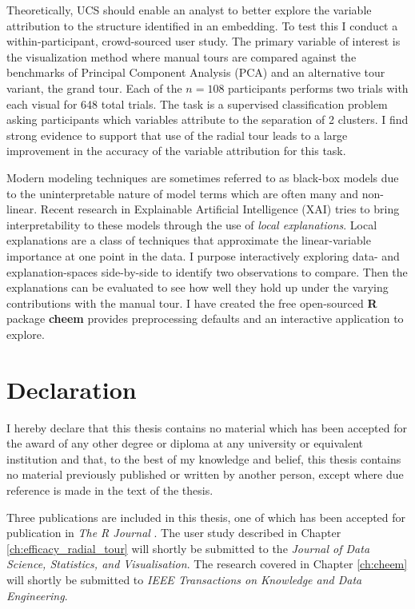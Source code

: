 \documentclass{template/monashthesis}
\begin{document}
Theoretically, UCS should enable an analyst to better explore the variable attribution to the structure identified in an embedding. To test this I conduct a within-participant, crowd-sourced user study. The primary variable of interest is the visualization method where manual tours are compared against the benchmarks of Principal Component Analysis (PCA) and an alternative tour variant, the grand tour. Each of the \(n=108\) participants performs two trials with each visual for 648 total trials. The task is a supervised classification problem asking participants which variables attribute to the separation of 2 clusters. I find strong evidence to support that use of the radial tour leads to a large improvement in the accuracy of the variable attribution for this task.

Modern modeling techniques are sometimes referred to as black-box models due to the uninterpretable nature of model terms which are often many and non-linear. Recent research in Explainable Artificial Intelligence (XAI) tries to bring interpretability to these models through the use of \emph{local explanations}. Local explanations are a class of techniques that approximate the linear-variable importance at one point in the data. I purpose interactively exploring data- and explanation-spaces side-by-side to identify two observations to compare. Then the explanations can be evaluated to see how well they hold up under the varying contributions with the manual tour. I have created the free open-sourced \textbf{R} package \textbf{cheem} provides preprocessing defaults and an interactive application to explore.

\clearpage{}\setcounter{page}{0}

\hypertarget{declaration}{%
\chapter*{Declaration}\label{declaration}}

I hereby declare that this thesis contains no material which has been accepted for the award of any other degree or diploma at any university or equivalent institution and that, to the best of my knowledge and belief, this thesis contains no material previously published or written by another person, except where due reference is made in the text of the thesis.

Three publications are included in this thesis, one of which has been accepted for publication in \emph{The R Journal} \autocite{spyrison_spinifex_2020}. The user study described in Chapter \ref{ch:efficacy_radial_tour} will shortly be submitted to the \emph{Journal of Data Science, Statistics, and Visualisation}. The research covered in Chapter \ref{ch:cheem} will shortly be submitted to \emph{IEEE Transactions on Knowledge and Data Engineering}.
\end{document}
